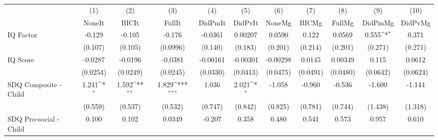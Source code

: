 {
\def\sym#1{\ifmmode^{#1}\else\(^{#1}\)\fi}
\begin{tabular}{l*{10}{c}}
\toprule
            &\multicolumn{1}{c}{(1)}&\multicolumn{1}{c}{(2)}&\multicolumn{1}{c}{(3)}&\multicolumn{1}{c}{(4)}&\multicolumn{1}{c}{(5)}&\multicolumn{1}{c}{(6)}&\multicolumn{1}{c}{(7)}&\multicolumn{1}{c}{(8)}&\multicolumn{1}{c}{(9)}&\multicolumn{1}{c}{(10)}\\
            &\multicolumn{1}{c}{NoneIt}&\multicolumn{1}{c}{BICIt}&\multicolumn{1}{c}{FullIt}&\multicolumn{1}{c}{DidPmIt}&\multicolumn{1}{c}{DidPvIt}&\multicolumn{1}{c}{NoneMg}&\multicolumn{1}{c}{BICMg}&\multicolumn{1}{c}{FullMg}&\multicolumn{1}{c}{DidPmMg}&\multicolumn{1}{c}{DidPvMg}\\
\midrule
IQ Factor   &      -0.129         &      -0.105         &      -0.176         &     -0.0361         &     0.00207         &      0.0590         &       0.122         &      0.0569         &       0.555\sym{*}  &       0.371         \\
            &     (0.107)         &     (0.105)         &    (0.0996)         &     (0.140)         &     (0.183)         &     (0.201)         &     (0.214)         &     (0.201)         &     (0.271)         &     (0.271)         \\
\addlinespace
IQ Score    &     -0.0287         &     -0.0196         &     -0.0381         &    -0.00161         &    -0.00301         &    -0.00298         &      0.0145         &     0.00349         &       0.115         &      0.0612         \\
            &    (0.0254)         &    (0.0249)         &    (0.0245)         &    (0.0330)         &    (0.0413)         &    (0.0475)         &    (0.0491)         &    (0.0480)         &    (0.0642)         &    (0.0624)         \\
\addlinespace
SDQ Composite - Child&       1.241\sym{*}  &       1.592\sym{**} &       1.829\sym{***}&       1.036         &       2.021\sym{*}  &      -1.058         &      -0.960         &      -0.536         &      -1.600         &      -1.144         \\
            &     (0.559)         &     (0.537)         &     (0.532)         &     (0.747)         &     (0.842)         &     (0.825)         &     (0.781)         &     (0.744)         &     (1.438)         &     (1.318)         \\
\addlinespace
SDQ Pro-social - Child&       0.100         &       0.102         &      0.0349         &      -0.207         &       0.358         &       0.480         &       0.541         &       0.573         &       0.957         &       0.610         \\

\end{tabular}}

